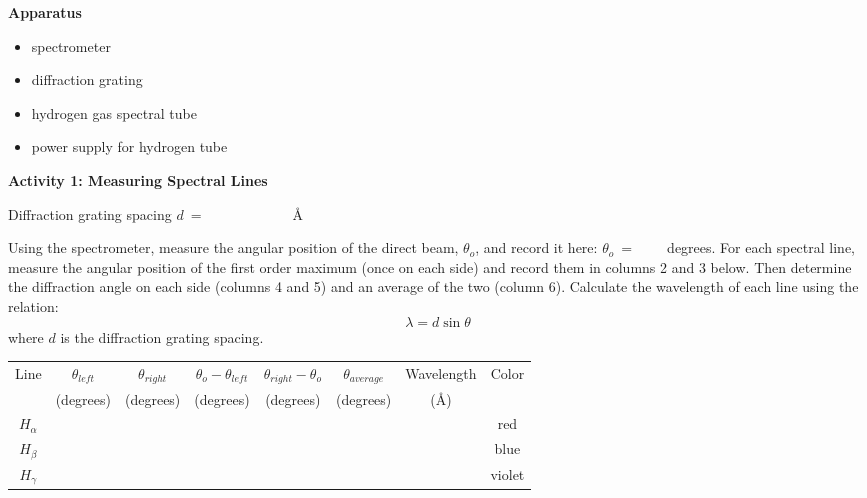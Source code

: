 \textbf{Apparatus}

\begin{itemize}

\item spectrometer

\item diffraction grating

\item hydrogen gas spectral tube

\item power supply for hydrogen tube

\end{itemize}


\vspace{0.2in}

\textbf{Activity 1: Measuring Spectral Lines}

\bigskip

\noindent Diffraction grating spacing $d ~ = ~\qquad\qquad\qquad${\AA}
 
Using the spectrometer, measure the angular position of the direct beam, 
$\theta_{o}$, and record it here:  $\theta_{o} ~ = ~\qquad$degrees.
For each spectral line, measure the angular position of the first order maximum 
(once on each side) and record them in columns 2 and 3 below. Then determine the
 diffraction angle on each side (columns 4 and 5) and an average of the two 
(column 6). Calculate the wavelength of each line using the relation:
\begin{equation}
\lambda = d \sin \theta
\end{equation}
where $d$ is the diffraction grating spacing.

\vspace{0.25in}

\begin{center}
{\renewcommand{\arraystretch}{1.5}
\begin{tabular}{|c|c|c|c|c|c|c|c|}\hline
Line        & $\theta_{left}$     & $\theta_{right}$     & $\theta_{o} - \theta_{left}$     & $\theta_{right} - \theta_{o}$    & $\theta_{average}$ & Wavelength  &  Color \\ 
            & (degrees)  &  (degrees)  & (degrees)  & (degrees) & (degrees) &({\AA})     &        \\ \hline
$H_\alpha$  &                     &                      &                    &             &     &    & red     \\ \hline
$H_\beta$   &                     &                      &                    &             &     &    & blue  \\ \hline
$H_\gamma$  &                     &                      &                    &             &     &    & violet  \\ \hline
\end{tabular}
}
\end{center}

